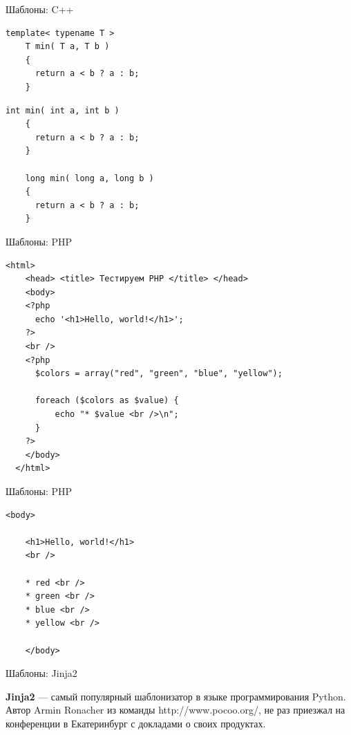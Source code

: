 \begin{frame}[fragile]{Шаблоны: C++}

  \begin{lstlisting}[style=cpp]
    template< typename T >
    T min( T a, T b )
    {
      return a < b ? a : b;
    }
  \end{lstlisting}

  \begin{lstlisting}[style=cpp]
    int min( int a, int b )
    {
      return a < b ? a : b;
    }

    long min( long a, long b )
    {
      return a < b ? a : b;
    }
  \end{lstlisting}

\end{frame}

\begin{frame}[fragile]{Шаблоны: PHP}

  \begin{lstlisting}[style=php]
  <html>
    <head> <title> Тестируем PHP </title> </head>
    <body>
    <?php
      echo '<h1>Hello, world!</h1>';
    ?>
    <br />
    <?php
      $colors = array("red", "green", "blue", "yellow");

      foreach ($colors as $value) {
          echo "* $value <br />\n";
      }
    ?>
    </body>
  </html>
  \end{lstlisting}

\end{frame}

\begin{frame}[fragile]{Шаблоны: PHP}

  \begin{lstlisting}[style=php]
    <body>

    <h1>Hello, world!</h1>
    <br />

    * red <br />
    * green <br />
    * blue <br />
    * yellow <br />

    </body>
  \end{lstlisting}

\end{frame}

\begin{frame}{Шаблоны: Jinja2}

  \textbf{Jinja2} — самый популярный шаблонизатор в языке программирования
  Python. Автор Armin Ronacher из команды http://www.pocoo.org/, не раз
  приезжал на конференции в Екатеринбург с докладами о своих продуктах.

\end{frame}


